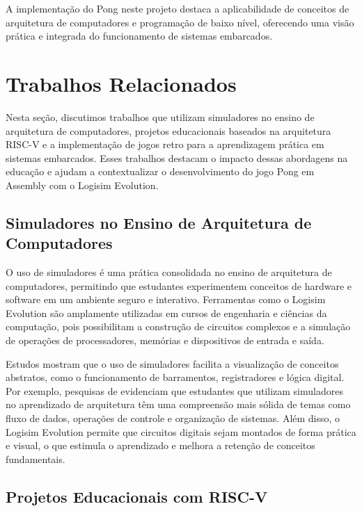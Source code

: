 \documentclass[english, spanish,brazilian]{RBIEarticle} %
\begin{document}
\begin{itemize}
A implementação do Pong neste projeto destaca a aplicabilidade de conceitos de arquitetura de computadores e programação de baixo nível, oferecendo uma visão prática e integrada do funcionamento de sistemas embarcados.




\section{Trabalhos Relacionados}

Nesta seção, discutimos trabalhos que utilizam simuladores no ensino de arquitetura de computadores, projetos educacionais baseados na arquitetura RISC-V e a implementação de jogos retro para a aprendizagem prática em sistemas embarcados. Esses trabalhos destacam o impacto dessas abordagens na educação e ajudam a contextualizar o desenvolvimento do jogo Pong em Assembly com o Logisim Evolution.

\subsection{Simuladores no Ensino de Arquitetura de Computadores}

O uso de simuladores é uma prática consolidada no ensino de arquitetura de computadores, permitindo que estudantes experimentem conceitos de hardware e software em um ambiente seguro e interativo. Ferramentas como o Logisim Evolution são amplamente utilizadas em cursos de engenharia e ciências da computação, pois possibilitam a construção de circuitos complexos e a simulação de operações de processadores, memórias e dispositivos de entrada e saída. 

Estudos mostram que o uso de simuladores facilita a visualização de conceitos abstratos, como o funcionamento de barramentos, registradores e lógica digital. Por exemplo, pesquisas de \cite{autorAno} evidenciam que estudantes que utilizam simuladores no aprendizado de arquitetura têm uma compreensão mais sólida de temas como fluxo de dados, operações de controle e organização de sistemas. Além disso, o Logisim Evolution permite que circuitos digitais sejam montados de forma prática e visual, o que estimula o aprendizado e melhora a retenção de conceitos fundamentais.

\subsection{Projetos Educacionais com RISC-V}


\end{itemize}
\end{document}
